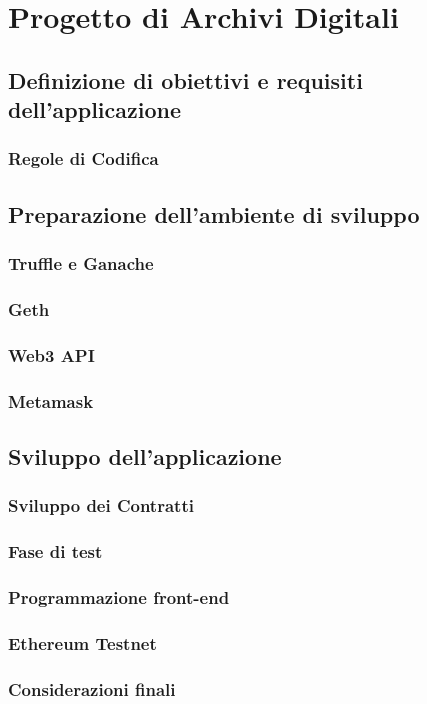 \chapter{Progetto di Archivi Digitali}
\label{ch:archivi}

\section{Definizione di obiettivi e requisiti dell’applicazione}

\subsection{Regole di Codifica}

\section{Preparazione dell'ambiente di sviluppo}

\subsection{Truffle e Ganache}

\subsection{Geth}

\subsection{Web3 API}

\subsection{Metamask}

\section{Sviluppo dell'applicazione}

\subsection{Sviluppo dei Contratti}

\subsection{Fase di test}

\subsection{Programmazione front-end}

\subsection{Ethereum Testnet}

\subsection{Considerazioni finali}


